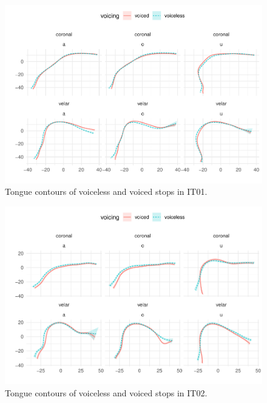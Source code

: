 \documentclass[11pt,]{article}
\begin{document}
\begin{figure}

{\centering \includegraphics[width=.8\textwidth]{2018-polar-gam_files/figure-latex/Figure06} 

}

\caption{Tongue contours of voiceless and voiced stops in IT01.}\label{f:Figure06}
\end{figure}

\begin{figure}

{\centering \includegraphics[width=.8\textwidth]{2018-polar-gam_files/figure-latex/Figure07} 

}

\caption{Tongue contours of voiceless and voiced stops in IT02.}\label{f:Figure07}
\end{figure}
\end{document}
